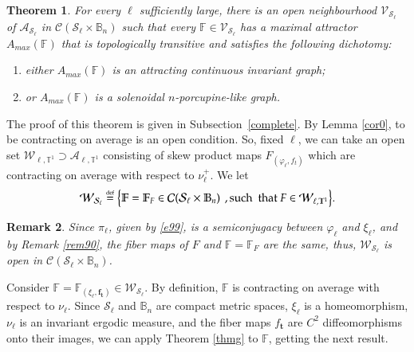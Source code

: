 \documentclass[11pt,reqno]{amsart}
\theoremstyle{plain}
\newtheorem{theorem}{Theorem}[section]
\newtheorem{remark}[theorem]{Remark}
\newtheorem*{theorem A}{Theorem A}
\newtheorem*{theorem B}{Theorem B}
\newtheorem*{theorem C}{Theorem C}
\newtheorem*{theorem 1}{Theorem 1}
\newtheorem*{theorem 2}{Theorem 2}
\newtheorem*{theorem 3}{Theorem 3}
\newcommand{\eqdef}{\stackrel{\scriptscriptstyle\rm def}{=}}
\numberwithin{equation}{section}
\begin{document}
\begin{theorem}\label{thm1}
For every $\ell$ sufficiently large, there is an open neighbourhood $ \mathcal{V}_{\mathcal{S}_\ell}$ of $ \mathcal{A}_{\mathcal{S}_\ell}$ in $\mathcal{C}(\mathcal{S}_\ell \times \mathbb{B}_n)$ such that every $\mathbb{F}\in \mathcal{V}_{\mathcal{S}_\ell}$ has a maximal attractor $A_{max}(\mathbb{F})$ that is topologically transitive and satisfies the following dichotomy:
 \begin{enumerate}
   \item [$-$] either $A_{max}(\mathbb{F})$ is an attracting continuous invariant graph;
   \item [$-$] or $A_{max}(\mathbb{F})$ is a solenoidal $n$-porcupine-like graph.
      \end{enumerate}
 \end{theorem}

The proof of this theorem is given in Subsection~\ref{complete}.
By Lemma \ref{cor0}, to be contracting on average is an open condition. So, fixed $\ell$, we can take an open set $\mathcal{W}_{\ell, \mathbb{T}^1} \supset \mathcal{A}_{\ell, \mathbb{T}^1}$ consisting of skew product maps $F_{(\varphi_\ell, f_t)}$ which are contracting on average with respect to $\nu^+_\ell$.
We let
\begin{equation}\label{vopen}
 \mathcal{W}_{\mathcal{S}_\ell} \eqdef \big\{\mathbb{F}=\mathbb{F}_{F} \in \mathcal{C}(\mathcal{S}_\ell \times \mathbb{B}_n) \,\ , \text{such \ that } F \in \mathcal{W}_{\ell, \mathbb{T}^1}\big\}.
\end{equation}

\begin{remark}\label{remopen}
Since $\pi_\ell$, given by \eqref{e99}, is a semiconjugacy between $\varphi_\ell$ and $\xi_\ell$, and by Remark \ref{rem90}, the fiber maps of $F$ and $\mathbb{F}=\mathbb{F}_{F}$ are the same, thus, $\mathcal{W}_{\mathcal{S}_\ell}$ is open in $\mathcal{C}(\mathcal{S}_\ell \times \mathbb{B}_n)$.
\end{remark}

Consider $\mathbb{F} = \mathbb{F}_{(\xi_\ell, \textbf{f}_{\textbf{t}})} \in \mathcal{W}_{\mathcal{S}_\ell}$.
By definition, $\mathbb{F}$ is contracting on average with respect to $\nu_\ell$.
Since $\mathcal{S}_\ell$ and $\mathbb{B}_n$ are compact metric spaces, $\xi_\ell$ is a homeomorphism, $\nu_\ell$ is an invariant ergodic measure, and the fiber maps $f_{\textbf{t}}$ are $C^2$ diffeomorphisms onto their images, we can apply Theorem \ref{thmg} to $\mathbb{F}$, getting the next result.
\end{document}

